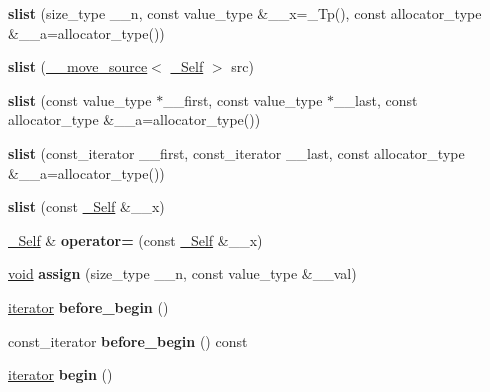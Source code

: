 \begin{DoxyCompactItemize}
{\bfseries slist} (size\+\_\+type \+\_\+\+\_\+n, const value\+\_\+type \&\+\_\+\+\_\+x=\+\_\+\+Tp(), const allocator\+\_\+type \&\+\_\+\+\_\+a=allocator\+\_\+type())
\item 
\mbox{\label{classslist_a77d6e9d0cd663c719756dd399adb6f1a}} 
{\bfseries slist} (\hyperlink{class____move__source}{\+\_\+\+\_\+move\+\_\+source}$<$ \hyperlink{classslist}{\+\_\+\+Self} $>$ src)
\item 
\mbox{\label{classslist_a665911ec97c61284eede5fa3a73a4c54}} 
{\bfseries slist} (const value\+\_\+type $\ast$\+\_\+\+\_\+first, const value\+\_\+type $\ast$\+\_\+\+\_\+last, const allocator\+\_\+type \&\+\_\+\+\_\+a=allocator\+\_\+type())
\item 
\mbox{\label{classslist_a2ab679da9e4fa382b1cd521c5af4a139}} 
{\bfseries slist} (const\+\_\+iterator \+\_\+\+\_\+first, const\+\_\+iterator \+\_\+\+\_\+last, const allocator\+\_\+type \&\+\_\+\+\_\+a=allocator\+\_\+type())
\item 
\mbox{\label{classslist_af378f800b391d2018df9473f131c8678}} 
{\bfseries slist} (const \hyperlink{classslist}{\+\_\+\+Self} \&\+\_\+\+\_\+x)
\item 
\mbox{\label{classslist_a4f463b453fbe85059c79dbe394f19e0c}} 
\hyperlink{classslist}{\+\_\+\+Self} \& {\bfseries operator=} (const \hyperlink{classslist}{\+\_\+\+Self} \&\+\_\+\+\_\+x)
\item 
\mbox{\label{classslist_a6a5fa01695fcda5c227217e5e7844022}} 
\hyperlink{interfacevoid}{void} {\bfseries assign} (size\+\_\+type \+\_\+\+\_\+n, const value\+\_\+type \&\+\_\+\+\_\+val)
\item 
\mbox{\label{classslist_a86d9b1c038344d26088832ea596334eb}} 
\hyperlink{structiterator}{iterator} {\bfseries before\+\_\+begin} ()
\item 
\mbox{\label{classslist_a9eaf3d9bcf4e8d8597b7e1affd3539a6}} 
const\+\_\+iterator {\bfseries before\+\_\+begin} () const
\item 
\mbox{\label{classslist_addbe19c1fcf1da5e4d568e6c540dd389}} 
\hyperlink{structiterator}{iterator} {\bfseries begin} ()

\end{DoxyCompactItemize}
